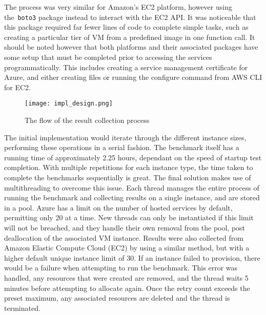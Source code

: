\documentclass{llncs}
\begin{document}
The process was very similar for Amazon's EC2 platform, however using the~\texttt{boto3} package instead to interact with the EC2 API. It was noticeable that this package required far fewer lines of code to complete simple tasks, such as creating a particular tier of VM from a predefined image in one function call. It should be noted however that both platforms and their associated packages have some setup that must be completed prior to accessing the services programmatically. This includes creating a service management certificate for Azure, and either creating files or running the configure command from AWS CLI for EC2.

\begin{figure}[ht]
  \centering
  \texttt{[image: impl\_design.png]}
  \caption{The flow of the result collection process}
  \label{fig:impldesign}
\end{figure}

The initial implementation would iterate through the different instance sizes, performing these operations in a serial fashion. The benchmark itself has a running time of approximately 2.25 hours, dependant on the speed of startup test completion. With multiple repetitions for each instance type, the time taken to complete the benchmarks sequentially is great. The final solution makes use of multithreading to overcome this issue. Each thread manages the entire process of running the benchmark and collecting results on a single instance, and are stored in a pool. Azure has a limit on the number of hosted services by default, permitting only 20 at a time. New threads can only be instantiated if this limit will not be breached, and they handle their own removal from the pool, post deallocation of the associated VM instance. Results were also collected from Amazon Elastic Compute Cloud (EC2) by using a similar method, but with a higher default unique instance limit of 30. If an instance failed to provision, there would be a failure when attempting to run the benchmark. This error was handled, any resources that were created are removed, and the thread waits 5 minutes before attempting to allocate again. Once the retry count exceeds the preset maximum, any associated resources are deleted and the thread is terminated.

\end{document}
